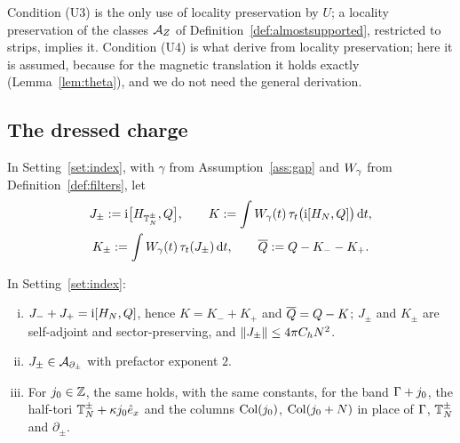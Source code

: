 Condition (U3) is the only use of locality preservation by $U$; a locality preservation of the classes $\mathcal{A}_Z$
of Definition~\ref{def:almostsupported}, restricted to strips, implies it. Condition (U4) is what \cite{BBDF21} derive from
locality preservation; here it is assumed, because for the magnetic translation it holds exactly
(Lemma~\ref{lem:theta}), and we do not need the general derivation.

\subsection{The dressed charge}

\begin{definition}\label{def:dressing}
In Setting~\ref{set:index}, with $\gamma$ from Assumption~\ref{ass:gap} and $W_{\gamma}$ from Definition~\ref{def:filters}, let
\begin{gather*}
J_\pm:=\mathrm{i}\bigl[H_{\mathbb{T}_N^\pm},Q\bigr],\qquad K:=\int W_{\gamma}(t)\,\tau_t\bigl(\mathrm{i}[H_N,Q]\bigr)\,\mathrm{d} t,\\
K_\pm:=\int W_{\gamma}(t)\,\tau_t(J_\pm)\,\mathrm{d} t,\qquad\overline{Q}:=Q-K_--K_+ .
\end{gather*}
\end{definition}

\begin{lemma}\label{lem:split}
In Setting~\ref{set:index}:
\begin{enumerate}[(i)]
\item $J_-+J_+=\mathrm{i}[H_N,Q]$, hence $K=K_-+K_+$ and $\overline{Q}=Q-K$; $J_\pm$ and $K_\pm$ are self-adjoint and
sector-preserving, and $\lVert J_\pm\rVert\le4\pi C_hN^2$.
\item $J_\pm\in\mathcal{A}_{\partial_\pm}$ with prefactor exponent $2$.
\item For $j_0\in\mathbb{Z}$, the same holds, with the same constants, for the band $\Gamma+j_0$, the half-tori
$\mathbb{T}_N^\pm+\kappa j_0\hat{e}_x$ and the columns $\mathrm{Col}(j_0)$, $\mathrm{Col}(j_0+N)$ in place of $\Gamma$, $\mathbb{T}_N^\pm$ and $\partial_\pm$.
\end{enumerate}
\end{lemma}

